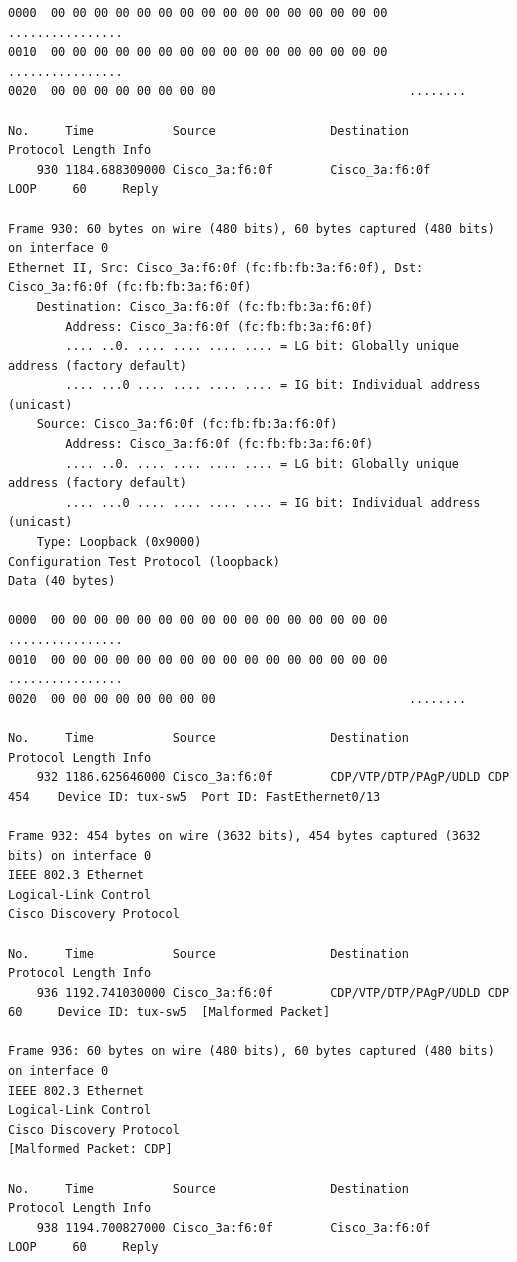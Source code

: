 \documentclass[a4paper,11pt]{article}
\begin{document}
\begin{lstlisting}
0000  00 00 00 00 00 00 00 00 00 00 00 00 00 00 00 00   ................
0010  00 00 00 00 00 00 00 00 00 00 00 00 00 00 00 00   ................
0020  00 00 00 00 00 00 00 00                           ........

No.     Time           Source                Destination           Protocol Length Info
    930 1184.688309000 Cisco_3a:f6:0f        Cisco_3a:f6:0f        LOOP     60     Reply

Frame 930: 60 bytes on wire (480 bits), 60 bytes captured (480 bits) on interface 0
Ethernet II, Src: Cisco_3a:f6:0f (fc:fb:fb:3a:f6:0f), Dst: Cisco_3a:f6:0f (fc:fb:fb:3a:f6:0f)
    Destination: Cisco_3a:f6:0f (fc:fb:fb:3a:f6:0f)
        Address: Cisco_3a:f6:0f (fc:fb:fb:3a:f6:0f)
        .... ..0. .... .... .... .... = LG bit: Globally unique address (factory default)
        .... ...0 .... .... .... .... = IG bit: Individual address (unicast)
    Source: Cisco_3a:f6:0f (fc:fb:fb:3a:f6:0f)
        Address: Cisco_3a:f6:0f (fc:fb:fb:3a:f6:0f)
        .... ..0. .... .... .... .... = LG bit: Globally unique address (factory default)
        .... ...0 .... .... .... .... = IG bit: Individual address (unicast)
    Type: Loopback (0x9000)
Configuration Test Protocol (loopback)
Data (40 bytes)

0000  00 00 00 00 00 00 00 00 00 00 00 00 00 00 00 00   ................
0010  00 00 00 00 00 00 00 00 00 00 00 00 00 00 00 00   ................
0020  00 00 00 00 00 00 00 00                           ........

No.     Time           Source                Destination           Protocol Length Info
    932 1186.625646000 Cisco_3a:f6:0f        CDP/VTP/DTP/PAgP/UDLD CDP      454    Device ID: tux-sw5  Port ID: FastEthernet0/13  

Frame 932: 454 bytes on wire (3632 bits), 454 bytes captured (3632 bits) on interface 0
IEEE 802.3 Ethernet 
Logical-Link Control
Cisco Discovery Protocol

No.     Time           Source                Destination           Protocol Length Info
    936 1192.741030000 Cisco_3a:f6:0f        CDP/VTP/DTP/PAgP/UDLD CDP      60     Device ID: tux-sw5  [Malformed Packet]

Frame 936: 60 bytes on wire (480 bits), 60 bytes captured (480 bits) on interface 0
IEEE 802.3 Ethernet 
Logical-Link Control
Cisco Discovery Protocol
[Malformed Packet: CDP]

No.     Time           Source                Destination           Protocol Length Info
    938 1194.700827000 Cisco_3a:f6:0f        Cisco_3a:f6:0f        LOOP     60     Reply


\end{lstlisting}
\end{document}
